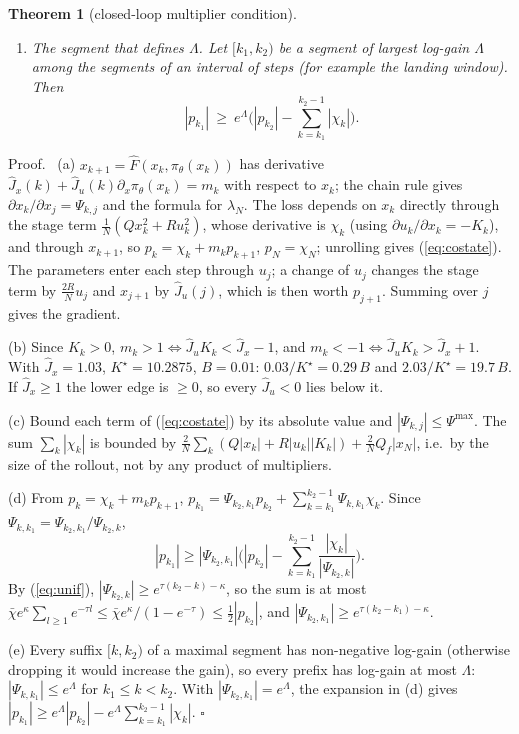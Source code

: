 \documentclass[11pt]{article}
\theoremstyle{plainnote}
\newtheorem{theorem}{Theorem}
\renewenvironment{proof}[1][Proof]{\par\noindent #1.\ }{\hfill$\square$\par}
\newcommand{\Jx}{\hat J_x}
\newcommand{\Ju}{\hat J_u}
\begin{document}
\begin{theorem}[closed-loop multiplier condition]
\begin{enumerate}
\begin{equation}
|p_{k_1}|\ \ge\ \tfrac12\,|p_{k_2}|\,e^{\tau(k_2-k_1)-\kappa}.
\label{eq:lower}
\end{equation}
\item[(e)] The segment that defines $\Lambda$. Let $[k_1,k_2)$ be a segment of largest log-gain $\Lambda$ among the segments of an interval of steps (for example the landing window). Then
\begin{equation}
|p_{k_1}|\ \ge\ e^{\Lambda}\Big(|p_{k_2}|-\sum_{k=k_1}^{k_2-1}|\chi_k|\Big).
\label{eq:lowerL}
\end{equation}
\end{enumerate}
\end{theorem}

\begin{proof}
(a) $x_{k+1}=\hat F(x_k,\pi_\theta(x_k))$ has derivative $\Jx(k)+\Ju(k)\partial_x\pi_\theta(x_k)=m_k$ with respect to $x_k$; the chain rule gives $\partial x_k/\partial x_j=\Psi_{k,j}$ and the formula for $\lambda_N$. The loss depends on $x_k$ directly through the stage term $\frac1N(Qx_k^2+Ru_k^2)$, whose derivative is $\chi_k$ (using $\partial u_k/\partial x_k=-K_k$), and through $x_{k+1}$, so $p_k=\chi_k+m_kp_{k+1}$, $p_N=\chi_N$; unrolling gives (\ref{eq:costate}). The parameters enter each step through $u_j$; a change of $u_j$ changes the stage term by $\frac{2R}{N}u_j$ and $x_{j+1}$ by $\Ju(j)$, which is then worth $p_{j+1}$. Summing over $j$ gives the gradient.

(b) Since $K_k>0$, $m_k>1\iff\Ju K_k<\Jx-1$, and $m_k<-1\iff\Ju K_k>\Jx+1$. With $\Jx=1.03$, $K^\star=10.2875$, $B=0.01$: $0.03/K^\star=0.29\,B$ and $2.03/K^\star=19.7\,B$. If $\Jx\ge1$ the lower edge is $\ge0$, so every $\Ju<0$ lies below it.

(c) Bound each term of (\ref{eq:costate}) by its absolute value and $|\Psi_{k,j}|\le\Psi^{\max}$. The sum $\sum_k|\chi_k|$ is bounded by $\frac2N\sum_k(Q|x_k|+R|u_k||K_k|)+\frac2NQ_f|x_N|$, i.e.\ by the size of the rollout, not by any product of multipliers.

(d) From $p_k=\chi_k+m_kp_{k+1}$, $p_{k_1}=\Psi_{k_2,k_1}p_{k_2}+\sum_{k=k_1}^{k_2-1}\Psi_{k,k_1}\chi_k$. Since $\Psi_{k,k_1}=\Psi_{k_2,k_1}/\Psi_{k_2,k}$,
\[
|p_{k_1}|\ge|\Psi_{k_2,k_1}|\Big(|p_{k_2}|-\sum_{k=k_1}^{k_2-1}\frac{|\chi_k|}{|\Psi_{k_2,k}|}\Big).
\]
By (\ref{eq:unif}), $|\Psi_{k_2,k}|\ge e^{\tau(k_2-k)-\kappa}$, so the sum is at most $\bar\chi e^{\kappa}\sum_{l\ge1}e^{-\tau l}\le\bar\chi e^\kappa/(1-e^{-\tau})\le\frac12|p_{k_2}|$, and $|\Psi_{k_2,k_1}|\ge e^{\tau(k_2-k_1)-\kappa}$.

(e) Every suffix $[k,k_2)$ of a maximal segment has non-negative log-gain (otherwise dropping it would increase the gain), so every prefix has log-gain at most $\Lambda$: $|\Psi_{k,k_1}|\le e^{\Lambda}$ for $k_1\le k<k_2$. With $|\Psi_{k_2,k_1}|=e^{\Lambda}$, the expansion in (d) gives $|p_{k_1}|\ge e^{\Lambda}|p_{k_2}|-e^{\Lambda}\sum_{k=k_1}^{k_2-1}|\chi_k|$.
\end{proof}
\end{document}
